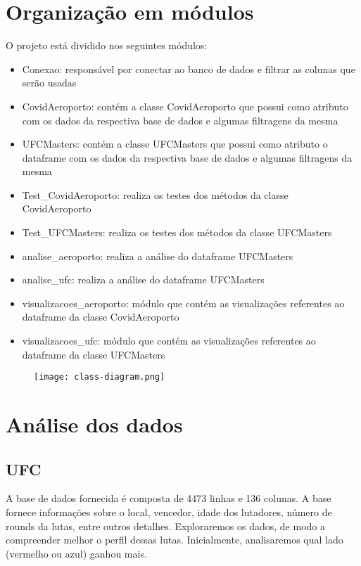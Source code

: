 \documentclass{article}
\begin{document}
\section{Organização em módulos}
O projeto está dividido nos seguintes módulos:
\begin{itemize}
    \item Conexao: responsável por conectar ao banco de dados e filtrar as colunas que serão usadas
    \item CovidAeroporto: contém a classe CovidAeroporto que possui como atributo com os dados da respectiva base de dados e algumas filtragens da mesma
    \item UFCMasters: contém a classe UFCMasters que possui como atributo o dataframe com os dados da respectiva base de dados e algumas filtragens da mesma
    \item Test\_CovidAeroporto: realiza os testes dos métodos da classe CovidAeroporto
    \item Test\_UFCMasters: realiza os testes dos métodos da classe UFCMasters
    \item analise\_aeroporto: realiza a análise do dataframe UFCMasters
    \item analise\_ufc: realiza a análise do dataframe UFCMasters
    \item visualizacoes\_aeroporto: módulo que contém as visualizações referentes ao dataframe da classe CovidAeroporto
    \item visualizacoes\_ufc: módulo que contém as visualizações referentes ao dataframe da classe UFCMasters
\end{itemize}

\begin{figure}[H] 
    \centering 
    \texttt{[image: class-diagram.png]} 
\end{figure}

\section{Análise dos dados}
\subsection{UFC}
A base de dados fornecida é composta de 4473 linhas e 136 colunas. A base fornece informações sobre o local, vencedor, idade dos lutadores, número de rounds da lutas, entre outros detalhes. Exploraremos os dados, de modo a compreender melhor o perfil dessas lutas. Inicialmente, analisaremos qual lado (vermelho ou azul) ganhou mais.
\end{document}

